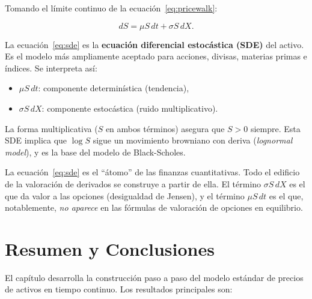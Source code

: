 \documentclass[12pt]{article}
\begin{document}
Tomando el l\'imite continuo de la ecuaci\'on~\eqref{eq:pricewalk}:

\begin{equation}
  \boxed{dS = \mu S\,dt + \sigma S\,dX.}
  \label{eq:sde}
\end{equation}

\begin{intuicionmat}
La ecuaci\'on~\eqref{eq:sde} es la \textbf{ecuaci\'on diferencial estoc\'astica
(SDE)} del activo. Es el modelo m\'as ampliamente aceptado para acciones, divisas,
materias primas e \'indices. Se interpreta as\'i:
\begin{itemize}
  \item $\mu S\,dt$: componente determin\'istica (tendencia),
  \item $\sigma S\,dX$: componente estoc\'astica (ruido multiplicativo).
\end{itemize}
La forma multiplicativa ($S$ en ambos t\'erminos) asegura que $S > 0$ siempre.
Esta SDE implica que $\log S$ sigue un movimiento browniano con deriva
(\textit{lognormal model}), y es la base del modelo de Black-Scholes.
\end{intuicionmat}

\begin{intuicion}
La ecuaci\'on~\eqref{eq:sde} es el ``\'atomo'' de las finanzas cuantitativas.
Todo el edificio de la valoraci\'on de derivados se construye a partir de ella.
El t\'ermino $\sigma S\,dX$ es el que da valor a las opciones (desigualdad de
Jensen), y el t\'ermino $\mu S\,dt$ es el que, notablemente, \emph{no aparece}
en las f\'ormulas de valoraci\'on de opciones en equilibrio.
\end{intuicion}

\section{Resumen y Conclusiones}

El cap\'itulo desarrolla la construcci\'on paso a paso del modelo est\'andar de
precios de activos en tiempo continuo. Los resultados principales son:
\end{document}
